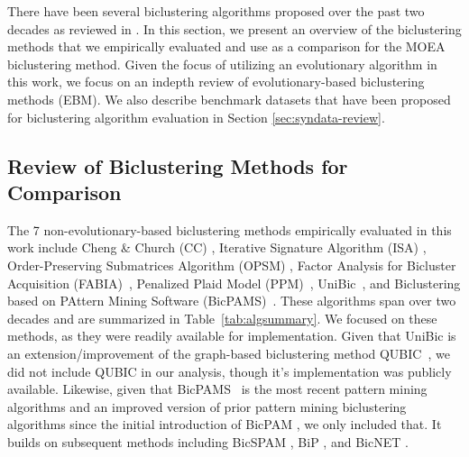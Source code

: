 
There have been several biclustering algorithms proposed over the past two decades as reviewed in  \cite{prelic2006systematic,eren2012comparative,oghabian2014biclustering,pontes2015biclustering,roy2016analysis}.%
In this section, we present an overview of the biclustering methods that we empirically evaluated and use as a comparison for the MOEA biclustering method. Given the focus of utilizing an evolutionary algorithm in this work, we focus on an indepth review of evolutionary-based biclustering methods (EBM).
We also describe benchmark datasets that have been proposed for biclustering algorithm evaluation in Section \ref{sec:syndata-review}.

\subsection{Review of Biclustering Methods for Comparison}
\label{sec:review-methods}

The 7 non-evolutionary-based biclustering methods empirically evaluated in this work include Cheng \& Church (CC) \cite{cheng2000biclustering}, Iterative Signature Algorithm (ISA) \cite{bergmann2003iterative}, Order-Preserving Submatrices Algorithm (OPSM) \cite{ben2003discovering}, Factor Analysis for Bicluster Acquisition (FABIA)~\cite{hochreiter2010fabia}, Penalized Plaid Model (PPM)~\cite{chekouo2015thepenalized}, UniBic~\cite{wang2016unibic}, and Biclustering based on PAttern Mining Software (BicPAMS)~\cite{henriques2017bicpams}.
These algorithms span over two decades and are summarized in Table~\ref{tab:algsummary}. We focused on these methods, as they were readily available for implementation. 
Given that UniBic is an extension/improvement of the graph-based biclustering method QUBIC~\cite{li2009qubic}, we did not include QUBIC in our analysis, though it's implementation was publicly available. Likewise, given that BicPAMS~\cite{henriques2017bicpams} is the most recent pattern mining algorithms and an improved version of prior pattern mining biclustering algorithms since the initial introduction of BicPAM \cite{henriques2014bicpam}, we only included that. 
It builds on subsequent methods including BicSPAM \cite{henriques2014bicspam}, BiP \cite{henriques2015biclustering}, and BicNET \cite{henriques2016bicnet}.


